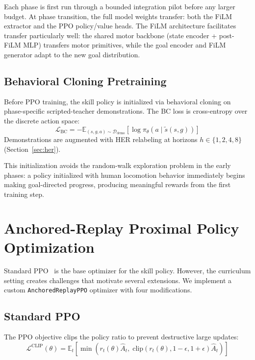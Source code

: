 \documentclass[11pt,a4paper]{article}
\begin{document}
Each phase is first run through a bounded integration pilot before any larger budget.
At phase transition, the full model weights transfer: both the FiLM extractor and the PPO policy/value heads.
The FiLM architecture facilitates transfer particularly well: the shared motor backbone (state encoder + post-FiLM MLP) transfers motor primitives, while the goal encoder and FiLM generator adapt to the new goal distribution.

\subsection{Behavioral Cloning Pretraining}

Before PPO training, the skill policy is initialized via behavioral cloning on phase-specific scripted-teacher demonstrations.
The BC loss is cross-entropy over the discrete action space:
\begin{equation}
\mathcal{L}_{\text{BC}} = -\mathbb{E}_{(s, g, a) \sim \mathcal{D}_{\text{demo}}} \left[\log \pi_\theta(a \mid \tilde{s}(s, g))\right]
\label{eq:bc-loss}
\end{equation}
Demonstrations are augmented with HER relabeling at horizons $h \in \{1, 2, 4, 8\}$ (Section~\ref{sec:her}).

This initialization avoids the random-walk exploration problem in the early phases: a policy initialized with human locomotion behavior immediately begins making goal-directed progress, producing meaningful rewards from the first training step.

\section{Anchored-Replay Proximal Policy Optimization}
\label{sec:ppo}

Standard PPO~\cite{schulman2017proximal} is the base optimizer for the skill policy.
However, the curriculum setting creates challenges that motivate several extensions.
We implement a custom \texttt{AnchoredReplayPPO} optimizer with four modifications.

\subsection{Standard PPO}

The PPO objective clips the policy ratio to prevent destructive large updates:
\begin{equation}
\mathcal{L}^{\text{CLIP}}(\theta) = \mathbb{E}_t\!\left[\min\!\left(r_t(\theta) \hat{A}_t,\; \text{clip}(r_t(\theta), 1-\epsilon, 1+\epsilon)\hat{A}_t\right)\right]
\label{eq:ppo-clip}
\end{equation}
\end{document}
